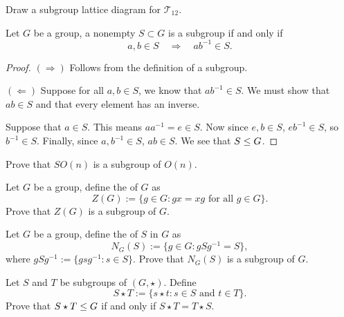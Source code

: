 \documentclass{ximera}
\begin{document}
\begin{exercise}
  Draw a subgroup lattice diagram for $\mathcal{T}_{12}$.
\end{exercise}


\begin{theorem}\label{T:sc}
  Let $G$ be a group, a nonempty $S\subset G$ is a subgroup if and
  only if
  \[
  a,b\in S \quad \Rightarrow \quad ab^{-1}\in S.
  \]
  \begin{proof}
    $(\Rightarrow)$ Follows from the definition of a subgroup.

    $(\Leftarrow)$ Suppose for all $a,b\in S$, we know that
    $ab^{-1}\in S$. We must show that $ab\in S$ and that every element
    has an inverse.

    Suppose that $a\in S$. This means $aa^{-1} = e\in S$.  Now since
    $e,b\in S$, $eb^{-1}\in S$, so $b^{-1}\in S$.  Finally, since
    $a,b^{-1}\in S$, $ab\in S$. We see that $S\leq G$.
  \end{proof}
\end{theorem}


\begin{exercise}
  Prove that $SO(n)$ is a subgroup of $O(n)$.
\end{exercise}


\begin{exercise}\label{E:center}
  Let $G$ be a group, define the  of $G$ as
  \[
  Z(G):=\{g\in G: \text{$gx=xg$ for all $g\in G$}\}.
  \]
  Prove that $Z(G)$ is a subgroup of $G$.
\end{exercise}


\begin{exercise}
  Let $G$ be a group, define the  of $S$ in $G$ as
  \[
  N_G(S):=\{g\in G: \text{$gSg^{-1} = S$}\},
  \]
  where $gSg^{-1}:=\{g sg^{-1}:s\in S\}$. Prove that $N_G(S)$ is a
  subgroup of $G$.
\end{exercise}



\begin{exercise}
  Let $S$ and $T$ be subgroups of $(G,\star)$. Define
  \[
  S\star T := \{ s\star t: \text{$s\in S$ and $t\in T$}\}.
  \]
  Prove that $S\star T\leq G$ if and only if $S\star T = T\star S$.
\end{exercise}



\end{document}
